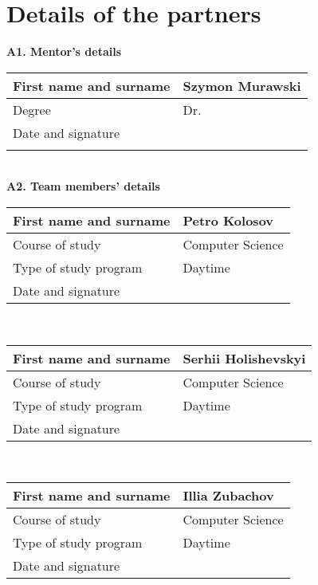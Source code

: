 \chapter*{Details of the partners}\label{ch:partner-details}
\textbf{A1. Mentor's details}\\[2mm]
\begin{tabular}{|p{}|p{}|}
    \hline
    First name and surname & Szymon Murawski \\
    \hline
    Degree                 & Dr.             \\
    \hline
    Date and signature     &                 \\
    \hline
    \multicolumn{2}{c}{\vspace{0.5cm}} \\
\end{tabular}
\\[5mm]
\textbf{A2. Team members' details} \\[2mm]
\begin{tabular}{|p{}|p{}|}
    \hline
    First name and surname & Petro Kolosov    \\
    \hline
    Course of study        & Computer Science \\
    \hline
    Type of study program  & Daytime          \\
    \hline
    Date and signature     &                  \\
    \hline

\end{tabular}
\\[5mm]
\begin{tabular}{|p{}|p{}|}
    \hline
    First name and surname & Serhii Holishevskyi \\
    \hline
    Course of study        & Computer Science    \\
    \hline
    Type of study program  & Daytime             \\
    \hline
    Date and signature     &                     \\
    \hline

\end{tabular}
\\[5mm]
\begin{tabular}{|p{}|p{}|}
    \hline
    First name and surname & Illia Zubachov   \\
    \hline
    Course of study        & Computer Science \\
    \hline
    Type of study program  & Daytime          \\
    \hline
    Date and signature     &                  \\
    \hline
\end{tabular}
